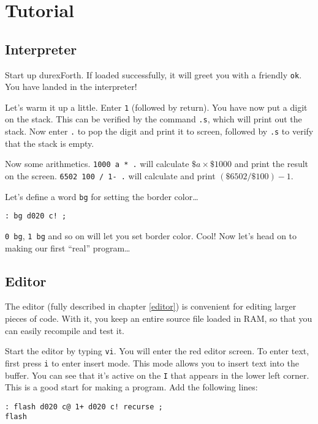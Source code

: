 \chapter{Tutorial}

\section{Interpreter}

Start up durexForth. If loaded successfully, it will greet you with a friendly \texttt{ok}. You have landed in the interpreter!

Let's warm it up a little. Enter \texttt{1} (followed by return). You have now put a digit on the stack. This can be verified by the command \texttt{.s}, which will print out the stack. Now enter \texttt{.} to pop the digit and print it to screen, followed by \texttt{.s} to verify that the stack is empty.

Now some arithmetics. \texttt{1000 a * .} will calculate $\$a \times \$1000$ and print the result on the screen. \texttt{6502 100 / 1- .} will calculate and print $(\$6502 / \$100) - 1$.

Let's define a word \texttt{bg} for setting the border color\ldots 

\begin{verbatim}
: bg d020 c! ;
\end{verbatim}

\texttt{0 bg}, \texttt{1 bg} and so on will let you set border color. Cool! Now let's head on to making our first ``real'' program\ldots

\section{Editor}

The editor (fully described in chapter \ref{editor}) is convenient for editing larger pieces of
code. With it, you keep an entire source file loaded in RAM, so that you can easily recompile and test it.

Start the editor by typing \texttt{vi}. You will enter the red editor screen.  
To enter text, first press \texttt{i} to enter insert mode. This mode allows you to insert text into the buffer. You can see that it's active on the \texttt{I} that appears in the lower left corner. This is a good start for making a program. Add the following lines:

\begin{verbatim}
: flash d020 c@ 1+ d020 c! recurse ;
flash
\end{verbatim}

